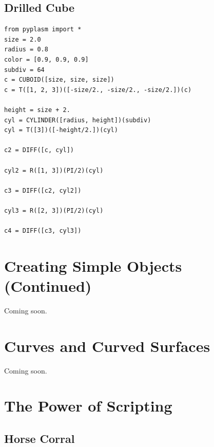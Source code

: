\documentclass[article,A4,12pt]{llncs}
\begin{document}
\subsection{Drilled Cube}

\begin{verbatim}
from pyplasm import *
size = 2.0
radius = 0.8
color = [0.9, 0.9, 0.9]
subdiv = 64
c = CUBOID([size, size, size])
c = T([1, 2, 3])([-size/2., -size/2., -size/2.])(c)

height = size + 2.
cyl = CYLINDER([radius, height])(subdiv)
cyl = T([3])([-height/2.])(cyl)

c2 = DIFF([c, cyl])

cyl2 = R([1, 3])(PI/2)(cyl)

c3 = DIFF([c2, cyl2])

cyl3 = R([2, 3])(PI/2)(cyl)

c4 = DIFF([c3, cyl3])
\end{verbatim}


\section{Creating Simple Objects (Continued)}

Coming soon.


\section{Curves and Curved Surfaces}

Coming soon.



\section{The Power of Scripting}

\subsection{Horse Corral}
\end{document}
